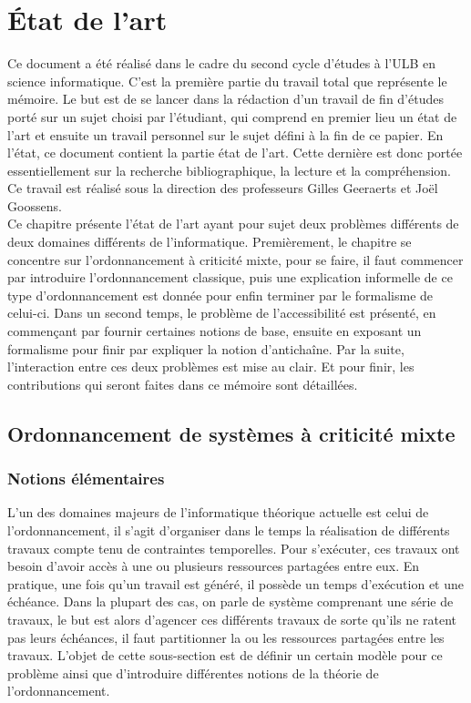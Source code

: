 \documentclass[a4paper]{report}
\theoremstyle{break}
\begin{document}
\tableofcontents
\chapter{État de l'art}
Ce document a été réalisé dans le cadre du second cycle d'études à l'ULB en science informatique. C'est la première partie du travail total que représente le mémoire. Le but est de se lancer dans la rédaction d'un travail de fin d'études porté sur un sujet choisi par l'étudiant, qui comprend en premier lieu un état de l'art et ensuite un travail personnel sur le sujet défini à la fin de ce papier. En l'état, ce document contient la partie état de l'art. Cette dernière est donc portée essentiellement sur la recherche bibliographique, la lecture et la compréhension. Ce travail est réalisé sous la direction des professeurs Gilles Geeraerts et Joël Goossens.\\

Ce chapitre présente l'état de l'art ayant pour sujet deux problèmes différents de deux domaines différents de l'informatique. Premièrement, le chapitre se concentre sur l'ordonnancement à criticité mixte, pour se faire, il faut commencer par introduire l'ordonnancement classique, puis une explication informelle de ce type d'ordonnancement est donnée pour enfin terminer par le formalisme de celui-ci. Dans un second temps, le problème de l'accessibilité est présenté, en commençant par fournir certaines notions de base, ensuite en exposant un formalisme pour finir par expliquer la notion d'antichaîne. Par la suite, l'interaction entre ces deux problèmes est mise au clair. Et pour finir, les contributions qui seront faites dans ce mémoire sont détaillées.

\section{Ordonnancement de systèmes à criticité mixte}
\subsection{Notions élémentaires}
L'un des domaines majeurs de l'informatique théorique actuelle est celui de l'ordonnancement, il s'agit d'organiser dans le temps la réalisation de différents travaux compte tenu de contraintes temporelles. Pour s'exécuter, ces travaux ont besoin d'avoir accès à une ou plusieurs ressources partagées entre eux. En pratique, une fois qu'un travail est généré, il possède un temps d'exécution et une échéance. Dans la plupart des cas, on parle de système comprenant une série de travaux, le but est alors d'agencer ces différents travaux de sorte qu'ils ne ratent pas leurs échéances, il faut partitionner la ou les ressources partagées entre les travaux. L'objet de cette sous-section est de définir un certain modèle pour ce problème ainsi que d'introduire différentes notions de la théorie de l'ordonnancement.
\end{document}
